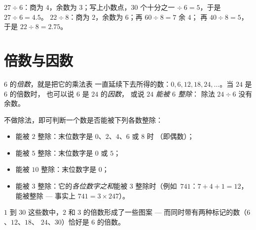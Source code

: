 \begin{example}\label{ex:g5:division:continue}
$27 \div 6$：商为 $4$，余数为 $3$；写上小数点，$30$ 个十分之一
$\div\ 6 = 5$，于是 $27 \div 6 = 4.5$。\quad
$22 \div 8$：商为 $2$，余数为 $6$；再 $60 \div 8 = 7$ 余 $4$；
再 $40 \div 8 = 5$，于是 $22 \div 8 = 2.75$。
\end{example}

\section{倍数与因数}

\begin{definition}[倍数、因数]\label{def:g5:division:multiple}
$6$ 的\emph{倍数}，就是把它的乘法表
一直延续下去所得的数：$0, 6, 12, 18, 24, \dots$。当 $24$ 是 $6$ 的倍数时，
也可以说 $6$ 是 $24$ 的\emph{因数}，
或说 $24$ \emph{能被 $6$ 整除}：
除法 $24 \div 6$ 没有余数。
\end{definition}

\begin{proposition}[整除速判法]\label{prop:g5:division:criteria}
不做除法，即可判断一个数是否能被下列各数整除：
\begin{itemize}
  \item 能被 $2$ 整除：末位数字是 $0$、$2$、$4$、$6$ 或 $8$ 时
        （即偶数）；
  \item 能被 $5$ 整除：末位数字是 $0$ 或 $5$；
  \item 能被 $10$ 整除：末位数字是 $0$；
  \item 能被 $3$ 整除：它的\emph{各位数字之和}能被
        $3$ 整除时（例如\ $741$：$7 + 4 + 1 = 12$，能被整除 --- 事实上
        $741 = 3 \times 247$）。
\end{itemize}
\end{proposition}
\admitted

\begin{omfigure}

{\small $1$ 到 $30$ 这些数中，$2$ 和 $3$ 的倍数形成了一些图案
--- 而同时带有两种标记的数（$6$、$12$、$18$、
$24$、$30$）恰好是 $6$ 的倍数。}
\end{omfigure}

